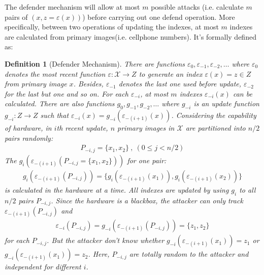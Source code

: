 \documentclass[10pt, conference, compsocconf]{IEEEtran}
\newtheorem{mydef}{Definition}
\begin{document}
        The defender mechanism will allow at most $m$ possible
        attacks (i.e. calculate $m$ pairs of $\left(x, z = \varepsilon(x)\right)$) 
        before carrying out one defend operation. More specifically, between
        two operations of updating the indexes,
        at most $m$ indexes are calculated from primary images(i.e. cellphone numbers).
        It's formally defined as:
        \begin{mydef}[Defender Mechanism]
            There are functions $\varepsilon_0, \varepsilon_{-1}, \varepsilon_{-2}, \ldots$ where
            $\varepsilon_0$ denotes the most recent function $\varepsilon: \mathcal{X} \rightarrow Z$
            to generate an index $\varepsilon(x) = z \in Z$ from primary image $x$.
            Besides, $\varepsilon_{-1}$ denotes the last one used before update, $\varepsilon_{-2}$ 
            for the last but one and so on.
            For each $\varepsilon_{-i}$, at most $m$ indexes $\varepsilon_{-i}(x)$ can be calculated.
            There are also functions $g_0, g_{-1}, g_{-2}, \ldots$ where
            $g_{-i}$ is an update function $g_{-i}: Z \rightarrow Z$ such that
            $\varepsilon_{-i}(x) = g_{-i}\left(\varepsilon_{-(i+1)}(x) \right)$. Considering the capability of hardware,
            in $i$th recent update,
            $n$ primary images in $\mathcal X$ are partitioned into $n/2$ pairs randomly:
            \begin{align*}
            	P_{-i, j} = \{x_1, x_2\} ~, ~ (0 \leq j < n/2)
            \end{align*}
            The $g_i\left(\varepsilon_{-(i+1)}(P_{-i, j} = \{x_1, x_2\})\right)$ for one pair:
            \begin{align*}
            	g_i\left(\varepsilon_{-(i+1)}(P_{-i, j})\right) = \{ g_i\left(\varepsilon_{-(i+1)}(x_1)\right),
            		g_i\left(\varepsilon_{-(i+1)}(x_2)\right) \}
            \end{align*}
            is 
            calculated in the hardware at a time. All indexes are updated by using
            $g_i$ to all $n/2$ pairs $P_{-i, j}$.
            Since the hardware is a blackbox, the attacker can only track 
            $\varepsilon_{-(i+1)}(P_{-i, j})$ and
            \begin{align*}
            	\varepsilon_{-i}(P_{-i, j}) = g_{-i}\left( \varepsilon_{-(i+1)}(P_{-i, j}) \right) = \{z_1, z_2\}
            \end{align*}
            for each $P_{-i, j}$.
            But the attacker don't know whether $g_{-i}(\varepsilon_{-(i+1)}(x_1)) = z_1$ or
            $g_{-i}(\varepsilon_{-(i+1)}(x_1)) = z_2$.
            Here, $P_{-i, j}$ are totally random
            to the attacker and independent for different $i$.
        \end{mydef}
\end{document}
